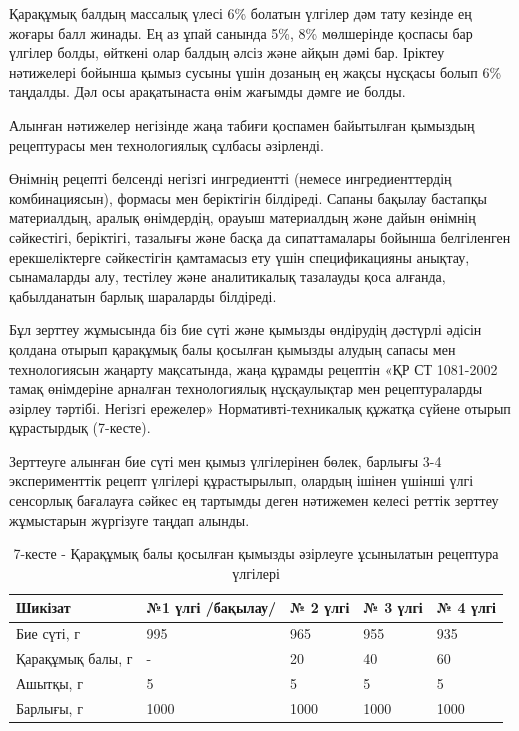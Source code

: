 \begin{multicols}{2}
Қарақұмық балдың массалық үлесі 6\% болатын үлгілер дәм тату кезінде ең
жоғары балл жинады. Ең аз ұпай санында 5\%, 8\% мөлшерінде қоспасы бар
үлгілер болды, өйткені олар балдың әлсіз және айқын дәмі бар. Іріктеу
нәтижелері бойынша қымыз сусыны үшін дозаның ең жақсы нұсқасы болып 6\%
таңдалды. Дәл осы арақатынаста өнім жағымды дәмге ие болды.

Алынған нәтижелер негізінде жаңа табиғи қоспамен байытылған қымыздың
рецептурасы мен технологиялық сұлбасы әзірленді.

Өнімнің рецепті белсенді негізгі ингредиентті (немесе ингредиенттердің
комбинациясын), формасы мен беріктігін білдіреді. Сапаны бақылау
бастапқы материалдың, аралық өнімдердің, орауыш материалдың және дайын
өнімнің сәйкестігі, беріктігі, тазалығы және басқа да сипаттамалары
бойынша белгіленген ерекшеліктерге сәйкестігін қамтамасыз ету үшін
спецификацияны анықтау, сынамаларды алу, тестілеу және аналитикалық
тазалауды қоса алғанда, қабылданатын барлық шараларды білдіреді.

Бұл зерттеу жұмысында біз бие сүті және қымызды өндірудің дәстүрлі
әдісін қолдана отырып қарақұмық балы қосылған қымызды алудың сапасы мен
технологиясын жаңарту мақсатында, жаңа құрамды рецептін «ҚР СТ 1081-2002
тамақ өнімдеріне арналған технологиялық нұсқаулықтар мен рецептураларды
әзірлеу тәртібі. Негізгі ережелер» Нормативті-техникалық құжатқа сүйене
отырып құрастырдық (7-кесте).

Зерттеуге алынған бие сүті мен қымыз үлгілерінен бөлек, барлығы 3-4
эксперименттік рецепт үлгілері құрастырылып, олардың ішінен үшінші үлгі
сенсорлық бағалауға сәйкес ең тартымды деген нәтижемен келесі реттік
зерттеу жұмыстарын жүргізуге таңдап алынды.
\end{multicols}

\begin{table}[H]
\caption*{7-кесте - Қарақұмық балы қосылған қымызды әзірлеуге ұсынылатын рецептура үлгілері}
\centering
\begin{tabular}{|l|l|l|l|l|}
\hline
Шикізат & №1 үлгі /бақылау/ & № 2 үлгі & № 3 үлгі & № 4 үлгі \\ \hline
Бие сүті, г & 995 & 965 & 955 & 935 \\ \hline
Қарақұмық балы, г & - & 20 & 40 & 60 \\ \hline
Ашытқы, г & 5 & 5 & 5 & 5 \\ \hline
Барлығы, г & 1000 & 1000 & 1000 & 1000 \\ \hline
\end{tabular}
\end{table}

